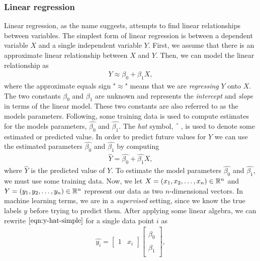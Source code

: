 \subsubsection{Linear regression}
\label{sec:linear-regression}
Linear regression, as the name suggests, attempts to find linear relationships between variables. The simplest form of linear regression is between a dependent variable $X$ and a single independent variable $Y$. First, we assume that there is an approximate linear relationship between $X$ and $Y$. Then, we can model the linear relationship as
\begin{align}
    Y \approx \beta_0 + \beta_1 X,
\end{align}
where the approximate equals sign "$\approx$" means that we are \textit{regressing} $Y$ onto $X$. The two constants $\beta_0$ and $\beta_1$ are unknown and represents the \textit{intercept} and \textit{slope} in terms of the linear model. These two constants are also referred to as the models parameters. Following, some training data is used to compute estimates for the models parameters, $\hat{\beta_0}$ and $\hat{\beta_1}$. The \textit{hat} symbol, $\string^$\,, is used to denote some estimated or predicted value. In order to predict future values for $Y$ we can use the estimated parameters $\hat{\beta_0}$ and $\hat{\beta_1}$ by computing
\begin{align}
    \hat{Y} = \hat{\beta_0} + \hat{\beta_1}X,
    \label{eqn:y-hat-simple}
\end{align}
where $\hat{Y}$ is the predicted value of $Y$. To estimate the model parameters $\hat{\beta_0}$ and $\hat{\beta_1}$, we must use some training data. Now, we let $X = (x_1, x_2, \ldots, x_n) \in \mathbb{R}^n$ and $Y = (y_1, y_2, \ldots, y_n) \in \mathbb{R}^n$ represent our data as two $n$-dimensional vectors. In machine learning terms, we are in a \textit{supervised} setting, since we know the true labels $y$ before trying to predict them. After applying some linear algebra, we can rewrite $\cref{eqn:y-hat-simple}$ for a single data point $i$ as
\begin{align}
    \hat{y_i} =
        \begin{bmatrix}
            1 & x_i
        \end{bmatrix}
        \begin{bmatrix}
            \hat{\beta}_0 \\
            \hat{\beta}_1 \\
        \end{bmatrix},
    \label{eqn:y-hat-two-matrix-form-single-point}
\end{align}

